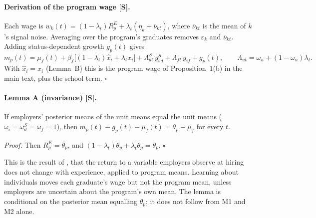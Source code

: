 \documentclass[11pt]{article}
\begin{document}
\paragraph{Derivation of the program wage [S].} Each wage is
$w_k(t)=(1-\lambda_t)R^E_p+\lambda_t(\eta_k+\bar\nu_{kt})$, where $\bar\nu_{kt}$ is the mean of $k$'s signal
noise. Averaging over the program's graduates removes $\varepsilon_k$ and $\bar\nu_{kt}$. Adding status-dependent
growth $g_p(t)$ gives
\begin{equation}\label{eq:T-wage}
m_p(t)=\mu_f(t)+\beta_f\big[(1-\lambda_t)\hat x_i+\lambda_tx_i\big]+\Lambda^S_{dt}\,y^S_{i\,d}+\Lambda_{ft}\,y_{if}+g_p(t),
\qquad \Lambda_{ut}=\omega_u+(1-\omega_u)\lambda_t .
\end{equation}
With $\hat x_i=x_i$ (Lemma~B) this is the program wage of Proposition~1(b) in the main text, plus the school term.
$\square$

\paragraph{Lemma A (invariance) [S].} If employers' posterior means of the unit means equal the unit means
($\omega_i=\omega^S_d=\omega_f=1$), then $m_p(t)-g_p(t)-\mu_f(t)=\theta_p-\mu_f$ for every $t$.

\emph{Proof.} Then $R^E_p=\theta_p$, and $(1-\lambda_t)\theta_p+\lambda_t\theta_p=\theta_p$. $\square$

This is the result of \citet{farber1996learning}, that the return to a variable employers observe at hiring does
not change with experience, applied to program means. Learning about individuals moves each graduate's wage but
not the program mean, unless employers are uncertain about the program's own mean. The lemma is conditional on
the posterior mean equalling $\theta_p$; it does not follow from M1 and M2 alone.
\end{document}
